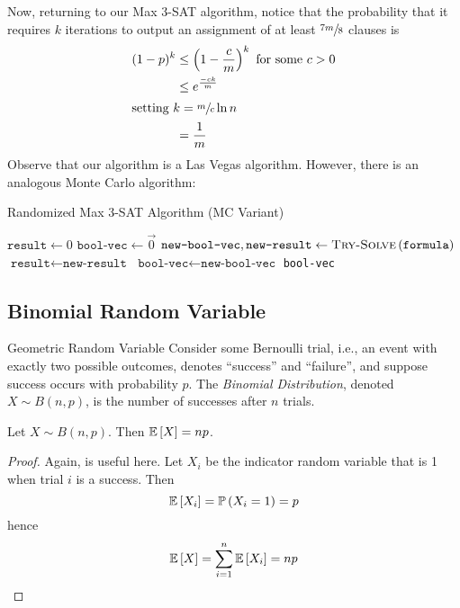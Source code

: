 Now, returning to our Max 3-SAT algorithm, notice that the probability that it
requires $k$ iterations to output an assignment of at least $\sfrac{7m}{8}$
\True clauses is
\begin{align*}(1 - p)^k
    &\leq \left(1 - \frac{c}{m}\right)^k\hbox{ for some $c > 0$}\\
    &\leq e^{\frac{-ck}{m}}\\
    \shortintertext{setting $k = \sfrac{m}{c}\ln{n}$}
    &= \frac{1}{m}
\end{align*}
Observe that our algorithm is a Las Vegas algorithm. However, there is an
analogous Monte Carlo algorithm:
\begin{algorithm}
    \caption{Randomized Max 3-SAT Algorithm (MC Variant)}
    \begin{algorithmic}[1]
            \State $\texttt{result} \gets 0$
            \State $\texttt{bool-vec} \gets \vec{0}$
                \State $\texttt{new-bool-vec}, \texttt{new-result} \gets \Call{Try-Solve}{\texttt{formula}}$
                    \State $\texttt{result} \gets \texttt{new-result}$
                    \State $\texttt{bool-vec} \gets \texttt{new-bool-vec}$
                \EndIf
            \EndForRange
            \State \Return \texttt{bool-vec}
        \EndFunction
    \end{algorithmic}
\end{algorithm}

\subsection{Binomial Random Variable}
\begin{definition}{Geometric Random Variable}{}
    Consider some Bernoulli trial, i.e., an event with exactly two possible
    outcomes, denotes ``success'' and ``failure'', and suppose success occurs
    with probability $p$. The \emph{Binomial Distribution}, denoted $X \sim
    B(n, p)$, is the number of successes after $n$ trials.
\end{definition}

\begin{theorem}{}{}
    Let $X \sim B(n, p)$. Then $\operatorname{\mathbb{E}}\left[X\right] = np$.
\end{theorem}

\begin{proof}
    Again,  is useful here. Let $X_i$ be the indicator
    random variable that is 1 when trial $i$ is a success. Then
    \[\operatorname{\mathbb{E}}\left[X_i\right] = \operatorname{\mathbb{P}}\left(X_i = 1\right) = p\]
    hence
    \[\operatorname{\mathbb{E}}\left[X\right] = \sum_{i=1}^n \operatorname{\mathbb{E}}\left[X_i\right] = np\qedhere\]
\end{proof}

